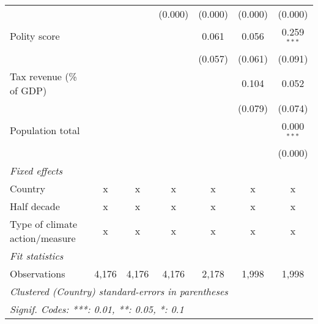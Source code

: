 \begin{tabular}{lcccccc}
                                                                                                      &         &         & (0.000)       & (0.000) & (0.000) & (0.000)\\   
   Polity score                                                                                       &         &         &               & 0.061   & 0.056   & 0.259$^{***}$\\   
                                                                                                      &         &         &               & (0.057) & (0.061) & (0.091)\\   
   Tax revenue (\% of GDP)                                                                            &         &         &               &         & 0.104   & 0.052\\   
                                                                                                      &         &         &               &         & (0.079) & (0.074)\\   
   Population total                                                                                   &         &         &               &         &         & 0.000$^{***}$\\   
                                                                                                      &         &         &               &         &         & (0.000)\\   
   \emph{Fixed effects}\\
   Country                                                                                            & x       & x       & x             & x       & x       & x\\  
   Half decade                                                                                        & x       & x       & x             & x       & x       & x\\  
   Type of climate action/measure                                                                     & x       & x       & x             & x       & x       & x\\  
   \midrule \emph{Fit statistics}\\
   Observations                                                                                       & 4,176   & 4,176   & 4,176         & 2,178   & 1,998   & 1,998\\  
   \midrule
   \multicolumn{7}{l}{\emph{Clustered (Country) standard-errors in parentheses}}\\
   \multicolumn{7}{l}{\emph{Signif. Codes: ***: 0.01, **: 0.05, *: 0.1}}\\
\end{tabular}
\par\endgroup


